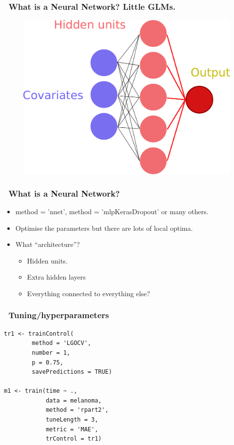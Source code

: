 \documentclass[handout, aspectratio = 169]{beamer}
\begin{document}
\begin{frame}
\frametitle{\insertframenumber~What is a Neural Network? Little GLMs.}

\vspace{6mm}
\begin{figure}
    \includegraphics[height = 0.7\textheight]{neural_network3.pdf}
\end{figure} 
\end{frame} 



\begin{frame}
\frametitle{\insertframenumber~What is a Neural Network?}

\begin{itemize}
\item method = 'nnet', method = 'mlpKerasDropout' or many others.
\item Optimise the parameters but there are lots of local optima.
\item What ``architecture''?
	\begin{itemize}
	\item Hidden units.
	\item Extra hidden layers
	\item Everything connected to everything else?
	\end{itemize}
\end{itemize}
\end{frame} 



\begin{frame}[fragile]
\frametitle{\insertframenumber~Tuning/hyperparameters}
\renewcommand{\FancyVerbFormatLine}[1]{%
   \ifnum\value{FancyVerbLine}=10\color{cyan}#1%
   \else #1\fi}
\begin{Verbatim}
tr1 <- trainControl(
        method = 'LGOCV',
        number = 1,
        p = 0.75,
        savePredictions = TRUE)

m1 <- train(time ~ ., 
            data = melanoma,
            method = 'rpart2',
            tuneLength = 3,
            metric = 'MAE',
            trControl = tr1)
            
\end{Verbatim}

\end{frame} 
\end{document}
